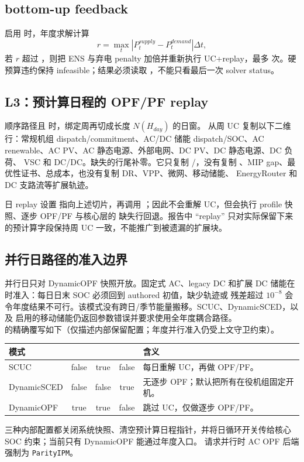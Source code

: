 \subsection{bottom-up feedback}
启用  时，年度求解计算
\begin{equation}
 r=\max_t |P_t^{supply}-P_t^{demand}|\Delta t,
\end{equation}
若 $r$ 超过 ，则把 ENS 与弃电 penalty 加倍并重新执行
UC+replay，最多  次。硬预算违约保持 infeasible；结果必须读取
，不能只看最后一次 solver status。

\subsection{L3：预计算日程的 OPF/PF replay}
顺序路径且  时，绑定周再切成长度 $N(H_{day})$ 的日窗。
 从周 UC 复制以下二维行：常规机组 dispatch/commitment、AC/DC 储能
dispatch/SOC、AC renewable、AC PV、AC 静态电源、外部电网、DC PV、DC 静态电源、DC 负荷、
VSC 和 DC/DC。缺失的行尾补零。它只复制 /，没有复制
、MIP gap、最优性证书、总成本，也没有复制 DR、VPP、微网、移动储能、
EnergyRouter 和 DC 支路流等扩展轨迹。

日 replay 设置  指向上述切片，再调用
；因此不会重解 UC，但会执行 profile 快照、逐步 OPF/PF 与核心层的
缺失行回退。报告中 ``replay'' 只对实际保留下来的预计算字段保持周 UC 一致，不能推广到被遗漏的扩展块。

\subsection{并行日路径的准入边界}
并行日只对 DynamicOPF 快照开放。固定式 AC、legacy DC 和扩展 DC 储能在
 时准入：每日日末 SOC 必须回到 authored 初值，缺少轨迹或
残差超过 $10^{-8}$ 会令年度结果不可行。该模式没有跨日/季节能量搬移。SCUC、DynamicSCED，以及
启用的移动储能仍返回参数错误并要求使用全年度耦合路径。\\
 的精确覆写如下（仅描述内部保留配置；年度并行准入仍受上文守卫约束）。
\begin{center}\footnotesize
\begin{tabular}{@{}L{3.0cm}cccL{5.6cm}@{}}
\toprule
模式 &  &  &  & 含义\\ \midrule
SCUC & false & true & false & 每日重解 UC，再做 OPF/PF。\\
DynamicSCED & false & false & true & 无逐步 OPF；默认把所有在役机组固定开机。\\
DynamicOPF & true & true & false & 跳过 UC，仅做逐步 OPF/PF。\\
\bottomrule
\end{tabular}
\end{center}
三种内部配置都关闭系统快照、清空预计算日程指针，并将日循环开关传给核心 SOC 约束；当前只有
DynamicOPF 能通过年度入口。
请求并行时 AC OPF 后端强制为 \texttt{ParityIPM}。

